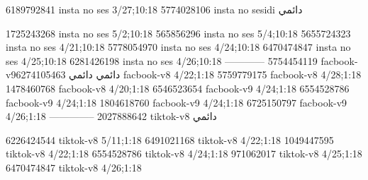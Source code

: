 
6189792841 insta no ses
3/27;10:18
5774028106 insta no sesidi
دائمي


1725243268 insta no ses
5/2;10:18
565856296 insta no ses
5/4;10:18
5655724323 insta no ses
4/21;10:18
5778054970 insta no ses
4/24;10:18
6470474847 insta no ses
4/25;10:18
6281426198 insta no ses
4/26;10:18
------------
5754454119 facbook-v9دائمي
دائمي
6274105463 facbook-v8
4/22;1:18
5759779175 facbook-v8
4/28;1:18
1478460768 facbook-v8
4/20;1:18
6546523654 facbook-v9
4/24;1:18
6554528786 facbook-v9
4/24;1:18
1804618760 facbook-v9
4/24;1:18
6725150797 facbook-v9
4/26;1:18
--------------
2027888642 tiktok-v8
دائمي

6226424544 tiktok-v8
5/11;1:18
6491021168 tiktok-v8
4/22;1:18
1049447595 tiktok-v8
4/22;1:18
6554528786 tiktok-v8
4/24;1:18
971062017 tiktok-v8
4/25;1:18
6470474847 tiktok-v8
4/26;1:18

